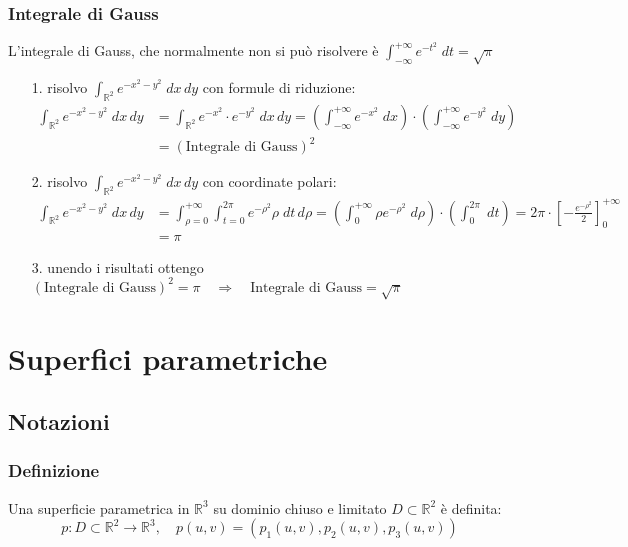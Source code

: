 \documentclass[a4paper]{article}
\newcommand\Rd{\mathbb{R}^2}  %
\newcommand\Rt{\mathbb{R}^3}  %
\begin{document}
\subsubsection*{Integrale di Gauss}
L'integrale di Gauss, che normalmente non si può risolvere è \(\displaystyle \int_{-\infty}^{+\infty} e^{-t^2} \; dt = \sqrt{\pi}\)
\begin{itemize}
	\item[1.] risolvo \(\displaystyle \int_{\Rd} e^{-x^2-y^2} \; dx \, dy\) con formule di riduzione:
	\begin{align*}
		\int_{\Rd} e^{-x^2-y^2} \; dx \, dy &= \int_{\Rd} e^{-x^2} \cdot e^{-y^2} \; dx \, dy = \left(\int_{-\infty}^{+\infty} e^{-x^2} \; dx\right) \cdot \left(\int_{-\infty}^{+\infty} e^{-y^2} \; dy\right) \qquad \qquad \qquad \quad\\
		&= (\text{Integrale di Gauss})^2
	\end{align*}
	\item[2.] risolvo \(\displaystyle \int_{\Rd} e^{-x^2-y^2} \; dx \, dy\) con coordinate polari:
	\begin{align*}
		\int_{\Rd} e^{-x^2-y^2} \; dx \, dy &= \int_{\rho = 0}^{+\infty} \int_{t = 0}^{2\pi} e^{-\rho^2} \rho \; dt \, d\rho = \left(\int_{0}^{+\infty} \rho e^{-\rho^2} \; d\rho\right) \cdot \left(\int_{0}^{2\pi} \; dt\right) = 2\pi \cdot \left[- \frac{e^{-\rho^2}}{2}\right]_0^{+\infty} \\
		& = \pi
	\end{align*}
	\item[3.] unendo i risultati ottengo \( (\text{Integrale di Gauss})^2 = \pi \quad \Rightarrow \quad \text{Integrale di Gauss} = \sqrt{\pi}\)
\end{itemize}

\newpage


\section{Superfici parametriche}
\subsection{Notazioni}
\subsubsection*{Definizione}
Una superficie parametrica in \(\Rt\) su dominio chiuso e limitato \(D \subset \Rd\) è definita:
\[p: D \subset \Rd \to \Rt, \quad p(u,v) = (p_1(u,v), p_2(u,v), p_3(u,v))\]
\end{document}
